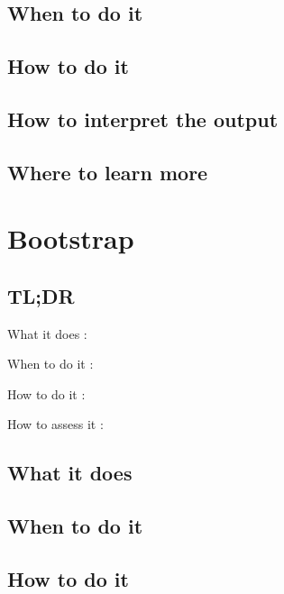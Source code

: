 \documentclass[
]{book}
\begin{document}
\hypertarget{when-to-do-it-9}{%
\section{When to do it}\label{when-to-do-it-9}}

\hypertarget{how-to-do-it-9}{%
\section{How to do it}\label{how-to-do-it-9}}

\hypertarget{how-to-interpret-the-output-9}{%
\section{How to interpret the output}\label{how-to-interpret-the-output-9}}

\hypertarget{where-to-learn-more-9}{%
\section{Where to learn more}\label{where-to-learn-more-9}}

\hypertarget{bootstrap}{%
\chapter{Bootstrap}\label{bootstrap}}

\hypertarget{tldr-10}{%
\section{TL;DR}\label{tldr-10}}

What it does
:

When to do it
:

How to do it
:

How to assess it
:

\hypertarget{what-it-does-10}{%
\section{What it does}\label{what-it-does-10}}

\hypertarget{when-to-do-it-10}{%
\section{When to do it}\label{when-to-do-it-10}}

\hypertarget{how-to-do-it-10}{%
\section{How to do it}\label{how-to-do-it-10}}
\end{document}
